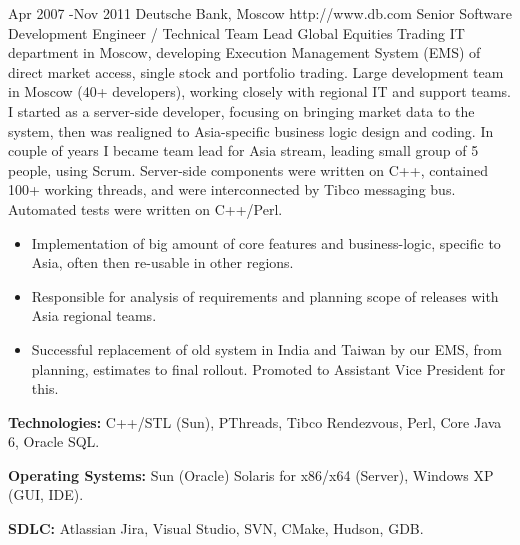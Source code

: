 \documentclass[10pt]{article} %
\begin{document}

\job
{Apr 2007 -}{Nov 2011}
{Deutsche Bank, Moscow}
{http://www.db.com}
{Senior Software Development Engineer / Technical Team Lead}
{Global Equities Trading IT department in Moscow, developing Execution Management System (EMS) of direct market access,
single stock and portfolio trading. Large development team in Moscow (40+ developers), working closely with regional IT 
and support teams. I started as a server-side developer, focusing on bringing market data to the system, then was realigned
to Asia-specific business logic design and coding. In couple of years I became team lead for Asia stream, 
leading small group of 5 people, using Scrum. Server-side components were written on C++, contained 100+ working threads,
and were interconnected by Tibco messaging bus. Automated tests were written on C++/Perl.}
{\begin{itemize}
\item{Implementation of big amount of core features and business-logic, specific to Asia, often then re-usable in other regions.}
\item{Responsible for analysis of requirements and planning scope of releases with Asia regional teams.}
\item{Successful replacement of old system in India and Taiwan by our EMS, from planning, estimates to final rollout.
Promoted to Assistant Vice President for this.}
\end{itemize}}
{\rule{0mm}{5mm}\textbf{Technologies:} C++/STL (Sun), PThreads, Tibco Rendezvous, Perl, Core Java 6, Oracle SQL.\\
\rule{0mm}{5mm}\textbf{Operating Systems:} Sun (Oracle) Solaris for x86/x64 (Server), Windows XP (GUI, IDE).\\
\rule{0mm}{5mm}\textbf{SDLC:} Atlassian Jira, Visual Studio, SVN, CMake, Hudson, GDB.
}

\end{document}
